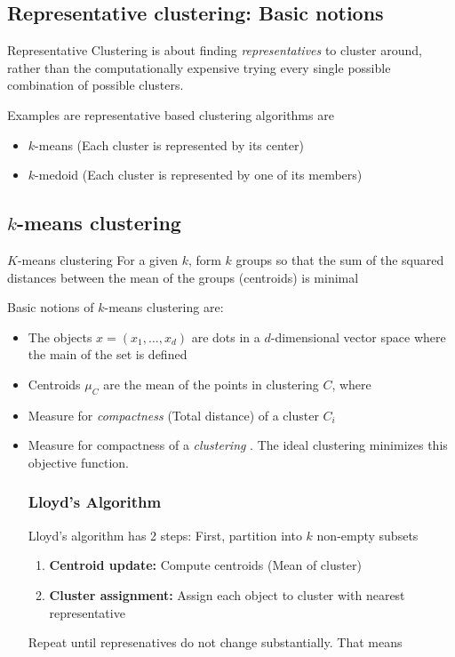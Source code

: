 \subsection{Representative clustering: Basic notions}

Representative Clustering is about finding \emph{representatives} to cluster around, rather than the computationally expensive trying every single possible combination of possible clusters.

Examples are representative based clustering algorithms are
\begin{itemize}
    \item $k$-means (Each cluster is represented by its center)
    \item $k$-medoid (Each cluster is represented by one of its members)
\end{itemize}


\subsection{$k$-means clustering}
    \begin{defi}{$K$-means clustering}
        For a given $k$, form $k$ groups so that the sum of the squared distances between the mean of the groups (centroids) is minimal
    \end{defi}

Basic notions of $k$-means clustering are:
\begin{itemize}
    \item The objects $x = (x_1, \dots, x_d)$ are dots in a $d$-dimensional vector space where the main of the set is defined
    \item Centroids $\mu_C$ are the mean of the points in clustering $C$, where 
    \item Measure for \emph{compactness} (Total distance) of a cluster $C_i$ 
    \item Measure for compactness of a \emph{clustering} . The ideal clustering minimizes this objective function.
    
\subsubsection{Lloyd's Algorithm}
    Lloyd's algorithm has 2 steps:
    First, partition into $k$ non-empty subsets
    \begin{enumerate}
        \item \textbf{Centroid update:} Compute centroids (Mean of cluster)
        \item \textbf{Cluster assignment:} Assign each object to cluster with nearest representative
    \end{enumerate}
    Repeat until represenatives do not change substantially. That means
\end{itemize}

